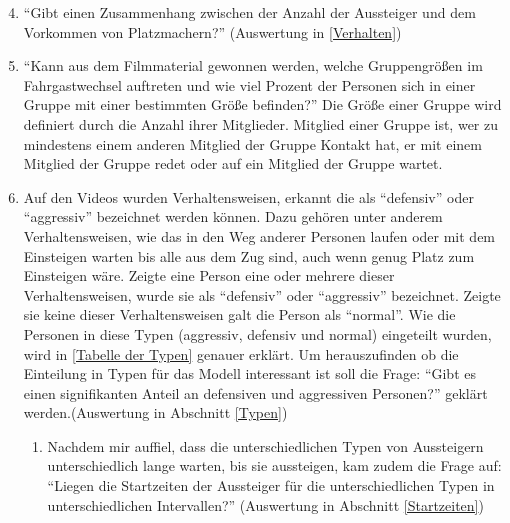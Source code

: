 \begin{enumerate}
\setcounter{enumi}{3}
	\item "`Gibt einen Zusammenhang zwischen der Anzahl der Aussteiger und dem Vorkommen von Platzmachern?"' (Auswertung in \ref{Verhalten})  \label{item:Platzmacher}
	\item "`Kann aus dem Filmmaterial gewonnen werden, welche Gruppengrößen im Fahrgastwechsel auftreten und wie viel Prozent der Personen sich in einer Gruppe mit einer bestimmten Größe befinden?"' Die Größe einer Gruppe wird definiert durch die Anzahl ihrer Mitglieder. Mitglied einer Gruppe ist, wer zu mindestens einem anderen Mitglied der Gruppe Kontakt hat, \dahe er mit einem Mitglied der Gruppe redet oder auf ein Mitglied der Gruppe wartet. \label{item:Goupsize} 
	\item Auf den Videos wurden Verhaltensweisen, erkannt die als "`defensiv"' oder "`aggressiv"' bezeichnet werden können. Dazu gehören unter anderem Verhaltensweisen, wie das in den Weg anderer Personen laufen oder mit dem Einsteigen warten bis alle aus dem Zug sind, auch wenn genug Platz zum Einsteigen wäre. Zeigte eine Person eine oder mehrere dieser Verhaltensweisen, wurde sie als "`defensiv"' oder "`aggressiv"' bezeichnet. Zeigte sie keine dieser Verhaltensweisen galt die Person als "`normal"'. Wie die Personen in diese Typen (aggressiv, defensiv und normal) eingeteilt wurden, wird in \ref{Tabelle der Typen} genauer erklärt. Um herauszufinden ob die Einteilung in Typen für das Modell interessant ist soll die Frage: "`Gibt es einen signifikanten Anteil an defensiven und aggressiven Personen?"' geklärt werden.(Auswertung in Abschnitt \ref{Typen}) \label{item:Typen,Typen}
	\begin{enumerate}
		\item Nachdem mir auffiel, dass die unterschiedlichen Typen von Aussteigern unterschiedlich lange warten, bis sie aussteigen, kam zudem die Frage auf: "`Liegen die Startzeiten der Aussteiger für die unterschiedlichen Typen in unterschiedlichen Intervallen?"' (Auswertung in Abschnitt \ref{Startzeiten}) \label{item:Typen,Startzeiten}
	\end{enumerate} 
\end{enumerate}